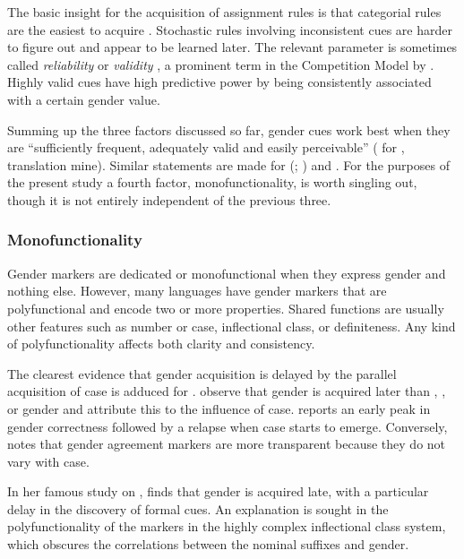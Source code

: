 \documentclass[output=collectionpaper]{langsci/langscibook}
\begin{document}
The basic insight for the acquisition of assignment rules is that categorial rules are the easiest to acquire \citep[114]{Mills1986}. Stochastic rules involving inconsistent cues are harder to figure out and appear to be learned later. The relevant parameter is sometimes called \textit{reliability} or \textit{validity} \citep{MacWhinney1978}, a prominent term in the Competition Model by \citet{MacWhinney1989}. Highly valid cues have high predictive power by being consistently associated with a certain gender value.

Summing up the three factors discussed so far, gender cues work best when they are ``sufficiently frequent, adequately valid and easily perceivable'' (\citealt[68]{Wegener1995} for , translation mine). Similar statements are made for  (\citealt{Mariscal2009}; \citealt{PerezPereira1991}) and  \citep[545]{Pizzuto1992}. For the purposes of the present study a fourth factor, monofunctionality, is worth singling out, though it is not entirely independent of the previous three.

\subsubsection{Monofunctionality}
\label{sec:Audr:4.2.4}

Gender markers are dedicated or monofunctional when they express gender and nothing else. However, many languages have gender markers that are polyfunctional and encode two or more properties. Shared functions are usually other features such as number or case, inflectional class, or definiteness. Any kind of polyfunctionality affects both clarity and consistency.

The clearest evidence that gender acquisition is delayed by the parallel acquisition of case is adduced for . \citet{Eichler2013} observe that  gender is acquired later than , , or  gender and attribute this to the influence of case. \citet{Bewer2004} reports an early peak in gender correctness followed by a relapse when case starts to emerge. Conversely, \citet{PerezPereira1991} notes that  gender agreement markers are more transparent because they do not vary with case.

In her famous study on , \citet{Mulford1985} finds that gender is acquired late, with a particular delay in the discovery of formal cues. An explanation is sought in the polyfunctionality of the markers in the highly complex  inflectional class system, which obscures the correlations between the nominal suffixes and gender.
\end{document}
